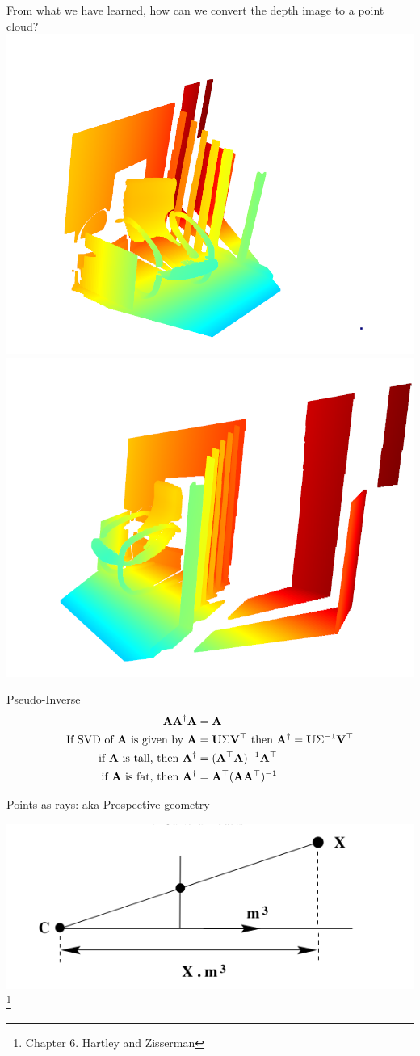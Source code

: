 \documentclass{beamer}
\begin{document}
  
  \begin{frame}
    From what we have learned, how can we convert the depth image to a point cloud?
    \includegraphics[width=0.45\linewidth]{media/depth-image-to-point-cloud-1.png}%
    \includegraphics[width=0.45\linewidth]{media/depth-image-to-point-cloud-2.png}
  \end{frame}


  \begin{frame}{Pseudo-Inverse}
    \begin{align}
      \mathbf{A} \mathbf{A}^\dagger \mathbf{A} &=  \mathbf{A} \\
      \text{If SVD of $\mathbf{A}$ is given by } \mathbf{A} &= \mathbf{U} \Sigma \mathbf{V}^\top 
      \text{ then } \mathbf{A}^\dagger = \mathbf{U} \Sigma^{-1} \mathbf{V}^\top \\
      \text{if } \mathbf{A} \text{ is tall, then } \mathbf{A}^\dagger &= (\mathbf{A}^\top \mathbf{A})^{-1} \mathbf{A}^\top \\
      \text{if } \mathbf{A} \text{ is fat, then } \mathbf{A}^\dagger &=  \mathbf{A}^\top (\mathbf{A} \mathbf{A}^\top)^{-1}
    \end{align}
  \end{frame}

  \begin{frame}{Points as rays: aka Prospective geometry}
  \end{frame}

  \begin{frame}
    \includegraphics[width=0.4\linewidth]{media/recovering-ray-from-point.png}
    \footnote{Chapter 6. Hartley and Zisserman}
  \end{frame}
\end{document}
